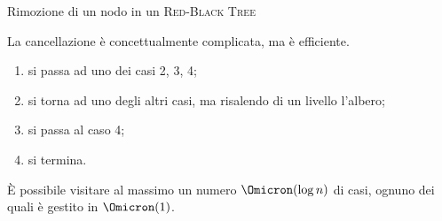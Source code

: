 \begin{algorithm}[H]
	\caption{Rimozione di un nodo in un \textsc{Red-Black Tree}}
	\setcounter{AlgoLine}{0}
	
\end{algorithm}

La cancellazione è concettualmente complicata, ma è efficiente.
\begin{enumerate}[label={\footnotesize\ttfamily (\arabic*)}, noitemsep, topsep = 5pt, parsep = 5pt, partopsep = 0pt]
	\item si passa ad uno dei casi 2, 3, 4;
	\item si torna ad uno degli altri casi, ma risalendo di un livello l'albero;
	\item si passa al caso 4;
	\item si termina.
\end{enumerate}

\`{E} possibile visitare al massimo un numero \(\Omicron(\log n)\) di casi, ognuno dei quali è gestito in \(\Omicron(1)\).

\ifsubfile

\fi
